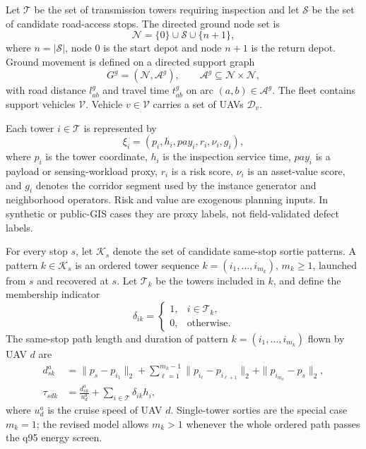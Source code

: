 Let \(\mathcal{T}\) be the set of transmission towers requiring inspection and let \(\mathcal{S}\) be the set of candidate road-access stops. The directed ground node set is
\begin{equation}
\mathcal{N}=\{0\}\cup\mathcal{S}\cup\{n+1\},
\label{eq:sb-ground-node-set}
\end{equation}
where \(n=|\mathcal{S}|\), node \(0\) is the start depot and node \(n+1\) is the return depot. Ground movement is defined on a directed support graph
\begin{equation}
G^g=(\mathcal{N},\mathcal{A}^g),
\qquad
\mathcal{A}^g\subseteq\mathcal{N}\times\mathcal{N},
\label{eq:ground-graph}
\end{equation}
with road distance \(l^g_{ab}\) and travel time \(t^g_{ab}\) on arc \((a,b)\in\mathcal{A}^g\). The fleet contains support vehicles \(\mathcal{V}\). Vehicle \(v\in\mathcal{V}\) carries a set of UAVs \(\mathcal{D}_v\).

Each tower \(i\in\mathcal{T}\) is represented by
\begin{equation}
\xi_i=(p_i,h_i,pay_i,r_i,\nu_i,g_i),
\label{eq:sb-task-tuple}
\end{equation}
where \(p_i\) is the tower coordinate, \(h_i\) is the inspection service time, \(pay_i\) is a payload or sensing-workload proxy, \(r_i\) is a risk score, \(\nu_i\) is an asset-value score, and \(g_i\) denotes the corridor segment used by the instance generator and neighborhood operators. Risk and value are exogenous planning inputs. In synthetic or public-GIS cases they are proxy labels, not field-validated defect labels.

For every stop \(s\), let \(\mathcal{K}_s\) denote the set of candidate same-stop sortie patterns. A pattern \(k\in\mathcal{K}_s\) is an ordered tower sequence \(k=(i_1,\ldots,i_{m_k})\), \(m_k\geq 1\), launched from \(s\) and recovered at \(s\). Let \(\mathcal{T}_k\) be the towers included in \(k\), and define the membership indicator
\begin{equation}
\delta_{ik}=
\begin{cases}
1, & i\in\mathcal{T}_k,\\
0, & \mathrm{otherwise}.
\end{cases}
\label{eq:sb-pattern-membership}
\end{equation}
The same-stop path length and duration of pattern \(k=(i_1,\ldots,i_{m_k})\) flown by UAV \(d\) are
\begin{align}
d^a_{sk}
&=\|p_s-p_{i_1}\|_2
+\sum_{\ell=1}^{m_k-1}\|p_{i_\ell}-p_{i_{\ell+1}}\|_2
+\|p_{i_{m_k}}-p_s\|_2,
\label{eq:sb-pattern-distance}\\
\tau_{sdk}
&=\frac{d^a_{sk}}{u^a_d}+\sum_{i\in\mathcal{T}}\delta_{ik}h_i,
\label{eq:sb-sortie-duration}
\end{align}
where \(u^a_d\) is the cruise speed of UAV \(d\). Single-tower sorties are the special case \(m_k=1\); the revised model allows \(m_k>1\) whenever the whole ordered path passes the q95 energy screen.


